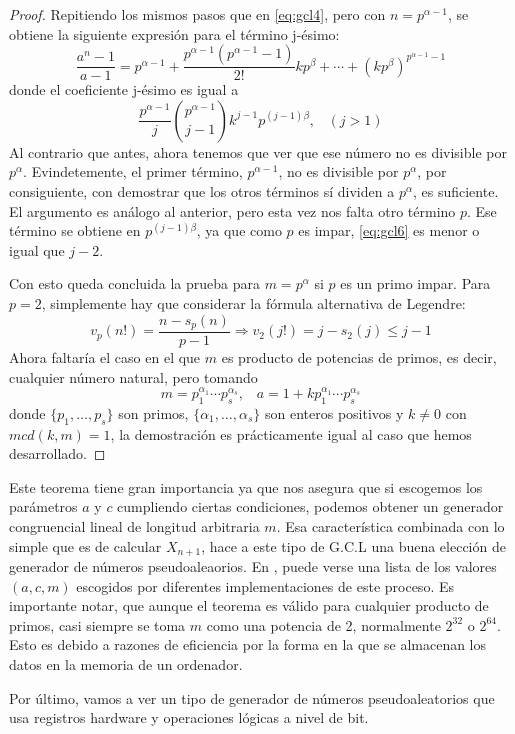 \begin{proof}
Repitiendo los mismos pasos que en \eqref{eq:gcl4}, pero con $n=p^{\alpha-1}$, se obtiene la siguiente expresión para el término j-ésimo:
\begin{equation}\label{eq:gcl5}
\frac{a^n-1}{a-1}=p^{\alpha-1}+\frac{p^{\alpha-1}(p^{\alpha-1}-1)}{2!}kp^\beta+\cdots+(kp^\beta)^{p^{\alpha-1}-1}
\end{equation}
donde el coeficiente j-ésimo es igual a
\[
\frac{p^{\alpha-1}}{j} \binom{p^{\alpha-1}}{j-1} k^{j-1}p^{(j-1)\beta}, \;\;\; (j>1)
\]
Al contrario que antes, ahora tenemos que ver que ese número no es divisible por $p^\alpha$. Evindetemente, el primer término, $p^{\alpha-1}$, no es divisible por $p^\alpha$, por consiguiente, con demostrar que los otros términos sí dividen a $p^\alpha$, es suficiente. El argumento es análogo al anterior, pero esta vez nos falta otro término $p$. Ese término se obtiene en $p^{(j-1)\beta}$, ya que como $p$ es impar, \eqref{eq:gcl6} es menor o igual que $j-2$.

Con esto queda concluida la prueba para $m=p^\alpha$ si $p$ es un primo impar. Para $p=2$, simplemente  hay que considerar la fórmula alternativa de Legendre:
\[
v_p(n!)=\frac{n-s_p(n)}{p-1} \Rightarrow v_2(j!)=j-s_2(j)\leq j-1
\]
Ahora faltaría el caso en el que $m$ es producto de potencias de primos, es decir, cualquier número natural, pero tomando 
\[
m=p_1^{\alpha_1}\cdots p_s^{\alpha_s}, \;\;\; a=1+kp_1^{\alpha_1}\cdots p_s^{\alpha_s}
\]
donde $\{p_1,\ldots, p_s\}$ son primos, $\{\alpha_1,\ldots,\alpha_s\}$ son enteros positivos y $k\neq 0$ con $mcd(k,m)=1$, la demostración es prácticamente igual al caso que hemos desarrollado.
\end{proof}

Este teorema tiene gran importancia ya que nos asegura que si escogemos los parámetros $a$ y $c$ cumpliendo ciertas condiciones, podemos obtener un generador congruencial lineal de longitud arbitraria $m$. Esa característica combinada con lo simple que es de calcular $X_{n+1}$, hace a este tipo de G.C.L una buena elección de generador de números pseudoaleaorios. En \cite{wiki:000}, puede verse una lista de los valores $(a,c,m)$ escogidos por diferentes implementaciones de este proceso. Es importante notar, que aunque el teorema es válido para cualquier producto de primos, casi siempre se toma $m$ como una potencia de 2, normalmente $2^{32}$ o $2^{64}$. Esto es debido a razones de eficiencia por la forma en la que se almacenan los datos en la memoria de un ordenador.

Por último, vamos a ver un tipo de generador de números pseudoaleatorios que usa registros hardware y operaciones lógicas a nivel de bit.

